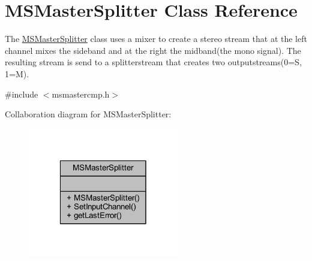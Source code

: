 \hypertarget{class_m_s_master_splitter}{\section{M\-S\-Master\-Splitter Class Reference}
\label{class_m_s_master_splitter}
}


The \hyperlink{class_m_s_master_splitter}{M\-S\-Master\-Splitter} class uses a mixer to create a stereo stream that at the left channel mixes the sideband and at the right the midband(the mono signal). The resulting stream is send to a splitterstream that creates two outputstreams(0=S, 1=M).  




{\ttfamily \#include $<$msmastercmp.\-h$>$}



Collaboration diagram for M\-S\-Master\-Splitter\-:\nopagebreak
\begin{figure}[H]
\begin{center}
\leavevmode
\includegraphics[width=186pt]{class_m_s_master_splitter__coll__graph}
\end{center}
\end{figure}
